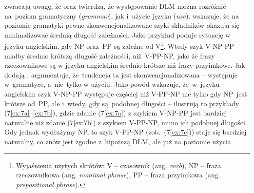 \documentclass[licencjacka]{pracamgr_Kogni}
\begin{document}
    \citet{Przepiorkowski2023} zwracają uwagę, że \citet{FutrellEtAl2020} oraz \citet{Hawkins1994} twierdzą, że występowanie DLM można rozróżnić na~poziom gramatyczny (\textit{grammar}), jak i~użycie języka (\textit{use}). \citet{Hawkins1994} wskazuje, że na poziomie gramatyki pewne skonwencjonalizowane szyki składników okazują się minimalizować średnią długość zależności.
    Jako przykład podaje sytuację w języku angielskim, gdy NP oraz~PP są zależne od V\footnote{Wyjaśnienia użytych skrótów: V -- czasownik (ang. \textit{verb}), NP -- fraza rzeczownikowa (ang. \textit{nomimal phrase}), PP -- fraza przyimkowa (ang. \textit{prepositional phrase}).}.
    Wtedy szyk V-NP-PP miałby średnio krótszą długość zależności, niż~V-PP-NP, jako że frazy rzeczownikowe są w języku angielskim średnio krótsze niż frazy przyimkowe.
    Jak dodają \citet{Przepiorkowski2023}, \citet{Hawkins1994} argumentuje, że~tendencja ta jest skonwencjonalizowana -- występuje w~gramatyce, a~nie~tylko w użyciu.
    Jako powód wskazuje, że~w~języku angielskim szyk V-NP-PP występuje częściej niż V-PP-NP nie tylko gdy NP~jest krótsze od~PP, ale i~wtedy, gdy są~podobnej długości -- ilustrują to przykłady (7\ref{ex:7a}--\ref{ex:7b}), gdzie zdanie (7\ref{ex:7a}) z szykiem V-NP-PP jest bardziej naturalne niż zdanie (7\ref{ex:7b}) z szykiem V-PP-NP, mimo ich podobnej długości.
    Gdy jednak wydłużymy NP, to szyk V-PP-NP (zob.~(7\ref{ex:7c})) staje się bardziej naturalny, co znów jest zgodne z~hipotezą DLM, ale już na poziomie użycia.
\end{document}
